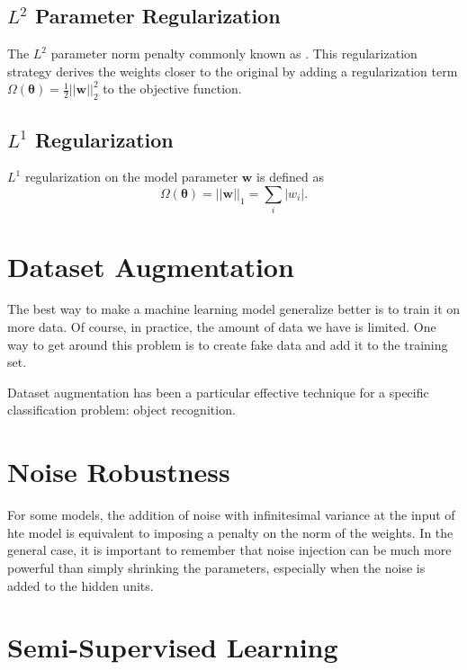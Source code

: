 \subsection{$L^2$ Parameter Regularization}

The $L^2$ parameter norm penalty commonly known as .
This regularization strategy derives the weights closer to the original by adding a regularization term $\Omega(\bm{\theta}) = \frac{1}{2} ||\bm{w}||_2^2$ to the objective function.


\subsection{$L^1$ Regularization}

$L^1$ regularization on the model parameter $\bm{w}$ is defined as
\begin{equation}
  \label{eq:l1}
  \Omega(\bm{\theta}) = ||\bm{w}||_1 = \sum_i |w_i|.
\end{equation}


\section{Dataset Augmentation}

The best way to make a machine learning model generalize better is to train it on more data.
Of course, in practice, the amount of data we have is limited.
One way to get around this problem is to create fake data and add it to the training set.


Dataset augmentation has been a particular effective technique for a specific classification problem: object recognition.

\section{Noise Robustness}

For some models, the addition of noise with infinitesimal variance at the input of hte model is equivalent to imposing a penalty on the norm of the weights.
In the general case, it is important to remember that noise injection can be much more powerful than simply shrinking the parameters, especially when the noise is added to the hidden units.



\section{Semi-Supervised Learning}

